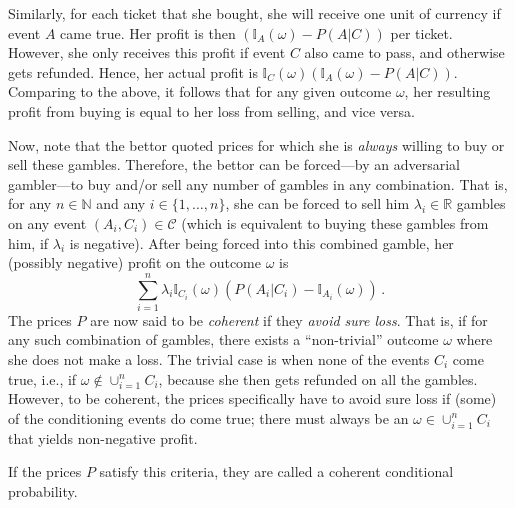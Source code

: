 \documentclass[10pt,a4paper]{paper}
\theoremstyle{definition}
\newcommand{\nats}{\mathbb{N}}
\newcommand{\reals}{\mathbb{R}}
\newcommand{\ind}[1]{\mathbb{I}_{#1}}
\begin{document}
Similarly, for each ticket that she bought, she will receive one unit of currency if event $A$ came true. Her profit is then $(\ind{A}(\omega) - P(A\vert C))$ per ticket. However, she only receives this profit if event $C$ also came to pass, and otherwise gets refunded. Hence, her actual profit is $\ind{C}(\omega)(\ind{A}(\omega) - P(A\vert C))$. Comparing to the above, it follows that for any given outcome $\omega$, her resulting profit from buying is equal to her loss from selling, and vice versa.

Now, note that the bettor quoted prices for which she is \emph{always} willing to buy or sell these gambles. Therefore, the bettor can be forced---by an adversarial gambler---to buy and/or sell any number of gambles in any combination. That is, for any $n\in\nats$ and any $i\in\{1,\ldots,n\}$, she can be forced to sell him $\lambda_i\in\reals$ gambles on any event $(A_i,C_i)\in\mathcal{C}$ (which is equivalent to buying these gambles from him, if $\lambda_i$ is negative). After being forced into this combined gamble, her (possibly negative) profit on the outcome $\omega$ is
\begin{equation*}
\sum_{i=1}^n\lambda_i\ind{C_i}(\omega)\left(P(A_i\vert C_i) - \ind{A_i}(\omega)\right)\,.
\end{equation*}
The prices $P$ are now said to be \emph{coherent} if they \emph{avoid sure loss}. That is, if for any such combination of gambles, there exists a ``non-trivial'' outcome $\omega$ where she does not make a loss. The trivial case is when none of the events $C_i$ come true, i.e., if $\omega\notin\cup_{i=1}^n C_i$, because she then gets refunded on all the gambles. However, to be coherent, the prices specifically have to avoid sure loss if (some) of the conditioning events do come true; there must always be an $\omega\in\cup_{i=1}^n C_i$ that yields non-negative profit.

If the prices $P$ satisfy this criteria, they are called a coherent conditional probability.
\end{document}
